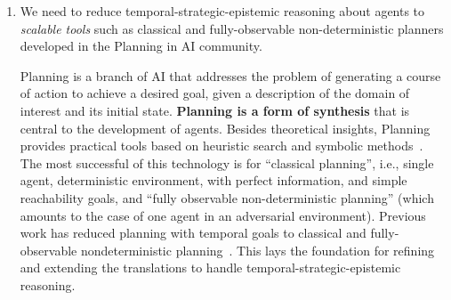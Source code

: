 \documentclass[a4paper,12pt,smallheadings]{scrartcl}
\newcommand\aside[1]{\textcolor{red}{#1}}
\begin{document}
\begin{enumerate}
\begin{itemize}
\end{itemize}

\item We need to reduce temporal-strategic-epistemic reasoning about agents to \emph{scalable tools} such as classical and fully-observable non-deterministic planners developed in the Planning in AI community.


Planning is a branch of AI that addresses the problem of generating a course of action to achieve
a desired goal, given a description of the domain of interest and its initial state. \textbf{Planning is a form of synthesis} 
that is central to the development of agents. Besides theoretical insights, Planning provides practical tools 
based on heuristic search and symbolic methods~\cite{GeffnerBo13}. The most successful of this technology 
is for ``classical planning'', i.e., single agent, deterministic environment, with perfect information, 
and simple reachability goals, and ``fully observable non-deterministic planning'' (which amounts to the case of one agent in an adversarial environment).
Previous work has reduced planning with temporal goals to classical and fully-observable 
nondeterministic planning~\cite{DBLP:conf/aaai/BaierM06,TorresB15,Camacho17}. This lays the foundation for refining and extending the translations to handle 
temporal-strategic-epistemic reasoning.


% 


\end{enumerate}
\end{document}

